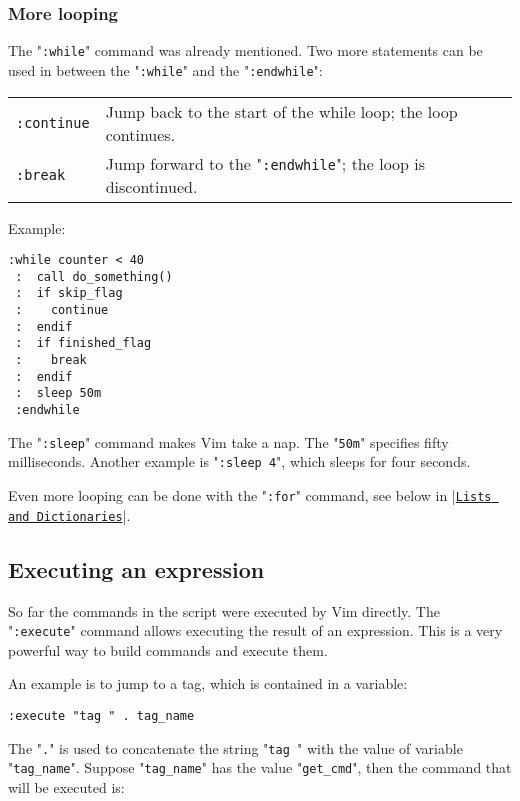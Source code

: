 \subsubsection{More looping}
The "\texttt{:while}" command was already mentioned.
Two more statements can be used in between the "\texttt{:while}" and the "\texttt{:endwhile}":

\begin{center} \begin{tabular}{l l}
				\texttt{:continue} & Jump back to the start of the while loop; the loop continues. \\
				\texttt{:break} & Jump forward to the "\texttt{:endwhile}"; the loop is discontinued. \\
\end{tabular} \end{center}

Example:

\begin{Verbatim}[samepage=true]
 :while counter < 40
 :  call do_something()
 :  if skip_flag
 :    continue
 :  endif
 :  if finished_flag
 :    break
 :  endif
 :  sleep 50m
 :endwhile
\end{Verbatim}

The "\texttt{:sleep}" command makes Vim take a nap.
The "\texttt{50m}" specifies fifty milliseconds.
Another example is "\texttt{:sleep 4}", which sleeps for four seconds.

Even more looping can be done with the "\texttt{:for}" command, see below in |\hyperref[Lists and Dictionaries]{\texttt{Lists and Dictionaries}}|.
\subsection{Executing an expression}
So far the commands in the script were executed by Vim directly.
The "\texttt{:execute}" command allows executing the result of an expression.
This is a very powerful way to build commands and execute them.

An example is to jump to a tag, which is contained in a variable:

\begin{Verbatim}[samepage=true]
 :execute "tag " . tag_name
\end{Verbatim}

The "\texttt{.}" is used to concatenate the string "\texttt{tag }" with the value of variable "\texttt{tag\_name}".
Suppose "\texttt{tag\_name}" has the value "\texttt{get\_cmd}", then the command that will be executed is:

